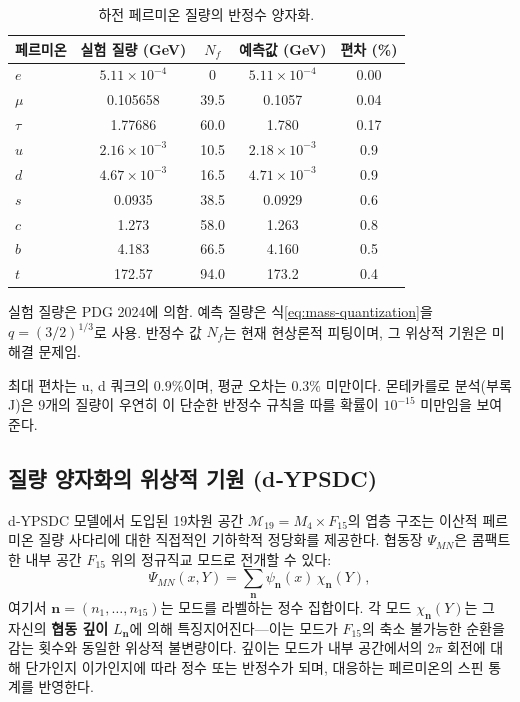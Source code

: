 \documentclass[12pt,a4paper]{article}
\begin{document}
	\begin{table}[H]
		\centering
		\caption{하전 페르미온 질량의 반정수 양자화.}
		\label{tab:fermions}
		\begin{tabular}{l c c c c}
			\toprule
			페르미온 & 실험 질량 (GeV) & \(N_f\) & 예측값 (GeV) & 편차 (\%) \\
			\midrule
			\(e\)   & \(5.11\times10^{-4}\) & 0      & \(5.11\times10^{-4}\) & 0.00 \\
			\(\mu\)  & 0.105658             & 39.5   & 0.1057               & 0.04 \\
			\(\tau\) & 1.77686              & 60.0   & 1.780                & 0.17 \\
			\(u\)   & \(2.16\times10^{-3}\) & 10.5   & \(2.18\times10^{-3}\) & 0.9 \\
			\(d\)   & \(4.67\times10^{-3}\) & 16.5   & \(4.71\times10^{-3}\) & 0.9 \\
			\(s\)   & 0.0935               & 38.5   & 0.0929               & 0.6 \\
			\(c\)   & 1.273                & 58.0   & 1.263                & 0.8 \\
			\(b\)   & 4.183                & 66.5   & 4.160                & 0.5 \\
			\(t\)   & 172.57               & 94.0   & 173.2                & 0.4 \\
			\bottomrule
		\end{tabular}
		\par\smallskip
		\footnotesize
		실험 질량은 PDG 2024에 의함. 예측 질량은 식\eqref{eq:mass-quantization}을 \(q = (3/2)^{1/3}\)로 사용. 반정수 값 \(N_f\)는 현재 현상론적 피팅이며, 그 위상적 기원은 미해결 문제임.
	\end{table}
	
	최대 편차는 u, d 쿼크의 \(0.9\%\)이며, 평균 오차는 \(0.3\%\) 미만이다. 몬테카를로 분석(부록 J)은 9개의 질량이 우연히 이 단순한 반정수 규칙을 따를 확률이 \(10^{-15}\) 미만임을 보여준다.
	
	\subsection{질량 양자화의 위상적 기원 (d‑YPSDC)}
	\label{subsec:topo-mass}
	\label{sec:d-ypsdc-model}
	
	d‑YPSDC 모델에서 도입된 19차원 공간 \(\mathcal{M}_{19}=M_4\times F_{15}\)의 엽층 구조는 이산적 페르미온 질량 사다리에 대한 직접적인 기하학적 정당화를 제공한다. 협동장 \(\Psi_{MN}\)은 콤팩트한 내부 공간 \(F_{15}\) 위의 정규직교 모드로 전개할 수 있다:
	\begin{equation}
		\Psi_{MN}(x,Y) = \sum_{\mathbf{n}} \psi_{\mathbf{n}}(x)\, \chi_{\mathbf{n}}(Y),
		\label{eq:mode-exp}
	\end{equation}
	여기서 \(\mathbf{n}=(n_1,\dots,n_{15})\)는 모드를 라벨하는 정수 집합이다.
	각 모드 \(\chi_{\mathbf{n}}(Y)\)는 그 자신의 \textbf{협동 깊이} \(L_{\mathbf{n}}\)에 의해 특징지어진다—이는 모드가 \(F_{15}\)의 축소 불가능한 순환을 감는 횟수와 동일한 위상적 불변량이다. 깊이는 모드가 내부 공간에서의 \(2\pi\) 회전에 대해 단가인지 이가인지에 따라 정수 또는 반정수가 되며, 대응하는 페르미온의 스핀 통계를 반영한다.
	
\end{document}
